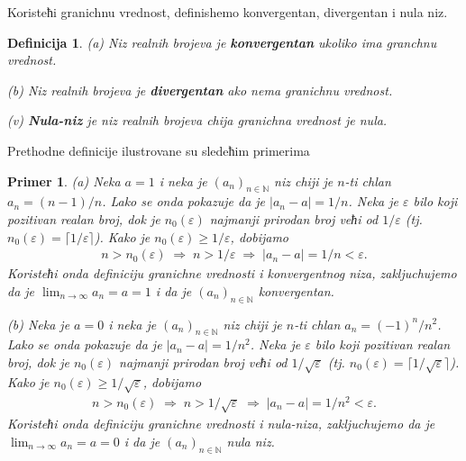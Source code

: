 \documentclass[11pt,a4paper]{article}
\newtheorem{defi}{Definicija}[section]
\newtheorem{pri}{Primer}[section]
\begin{document}
 Koristeћi granichnu vrednost, definishemo konvergentan,  
divergentan i nula niz. 
 
\begin{defi}
(a) Niz realnih brojeva je \textbf{konvergentan} ukoliko ima granchnu vrednost. 

(b) Niz realnih brojeva je \textbf{divergentan} ako 
nema granichnu vrednost.

(v) \textbf{Nula-niz} je niz realnih brojeva chija granichna 
vrednost je nula. 
\end{defi}

Prethodne definicije ilustrovane su sledeћim primerima

\begin{pri}\label{pri3.1}
(a) Neka $a=1$ i neka je $(a_n)_{n\in\mathbb{N}}$ niz chiji 
je $n$-ti chlan $a_n=(n-1)/n$. 
Lako se onda pokazuje da je $|a_n-a|=1/n$. 
Neka je $\varepsilon$ bilo koji pozitivan realan broj, 
dok je $n_{0}(\varepsilon)$ najmanji prirodan broj 
veћi od $1/\varepsilon$ 
(tj. $n_{0}(\varepsilon)=\lceil 1/\varepsilon \rceil$).
Kako je $n_{0}(\varepsilon)\geq 1/\varepsilon$, dobijamo 
\begin{align*}
    n>n_{0}(\varepsilon)
    \;\Rightarrow\; 
    n>1/\varepsilon
    \;\Rightarrow\;  
    |a_n-a|=1/n<\varepsilon. 
\end{align*}
Koristeћi onda definiciju granichne vrednosti 
i konvergentnog niza, 
zakljuchujemo da je 
$\displaystyle\lim_{n\rightarrow\infty}a_n=a=1$ i da je 
$(a_n)_{n\in\mathbb{N}}$ konvergentan. 

(b)  Neka je $a=0$ i neka je $(a_n)_{n\in\mathbb{N}}$ niz chiji 
je $n$-ti chlan $a_n=(-1)^n/n^2$. 
Lako se onda pokazuje da je $|a_n-a|=1/n^2$. 
Neka je $\varepsilon$ bilo koji pozitivan realan broj, 
dok je $n_{0}(\varepsilon)$ najmanji prirodan broj 
veћi od $1/\sqrt{\varepsilon}$ 
(tj. $n_{0}(\varepsilon)=\lceil 1/\sqrt{\varepsilon} \rceil$).
Kako je $n_{0}(\varepsilon)\geq 1/\sqrt{\varepsilon}$, dobijamo 
\begin{align*}
    n>n_{0}(\varepsilon)
    \;\Rightarrow\; 
    n>1/\sqrt{\varepsilon}
    \;\Rightarrow\;  
    |a_n-a|=1/n^2<\varepsilon. 
\end{align*}
Koristeћi onda definiciju granichne vrednosti 
i nula-niza, 
zakljuchujemo da je 
$\displaystyle\lim_{n\rightarrow\infty}a_n=a=0$ i da je
$(a_n)_{n\in\mathbb{N}}$ nula niz. 


\end{pri}
\end{document}
